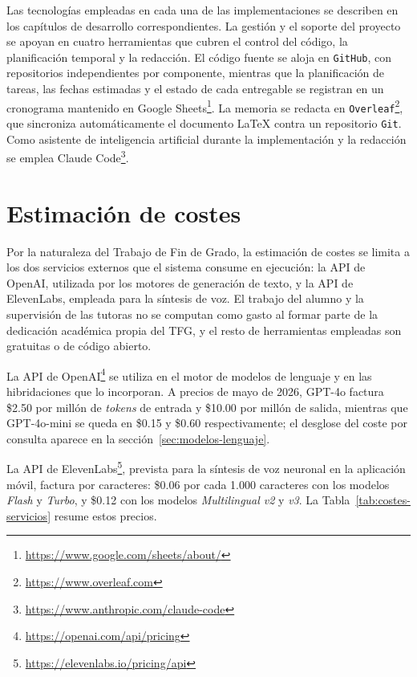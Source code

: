 Las tecnologías empleadas en cada una de las implementaciones se describen en los capítulos de desarrollo correspondientes. La gestión y el soporte del proyecto se apoyan en cuatro herramientas que cubren el control del código, la planificación temporal y la redacción. El código fuente se aloja en \texttt{GitHub}, con repositorios independientes por componente, mientras que la planificación de tareas, las fechas estimadas y el estado de cada entregable se registran en un cronograma mantenido en Google Sheets\footnote{\url{https://www.google.com/sheets/about/}}. La memoria se redacta en \texttt{Overleaf}\footnote{\url{https://www.overleaf.com}}, que sincroniza automáticamente el documento LaTeX contra un repositorio \texttt{Git}. Como asistente de inteligencia artificial durante la implementación y la redacción se emplea Claude Code\footnote{\url{https://www.anthropic.com/claude-code}}.

\section{Estimación de costes}
\label{sec:costes}

Por la naturaleza del Trabajo de Fin de Grado, la estimación de costes se limita a los dos servicios externos que el sistema consume en ejecución: la API de OpenAI, utilizada por los motores de generación de texto, y la API de ElevenLabs, empleada para la síntesis de voz. El trabajo del alumno y la supervisión de las tutoras no se computan como gasto al formar parte de la dedicación académica propia del TFG, y el resto de herramientas empleadas son gratuitas o de código abierto.

La API de OpenAI\footnote{\url{https://openai.com/api/pricing}} se utiliza en el motor de modelos de lenguaje y en las hibridaciones que lo incorporan. A precios de mayo de 2026, GPT-4o factura \$2.50 por millón de \textit{tokens} de entrada y \$10.00 por millón de salida, mientras que GPT-4o-mini se queda en \$0.15 y \$0.60 respectivamente; el desglose del coste por consulta aparece en la sección~\ref{sec:modelos-lenguaje}.

La API de ElevenLabs\footnote{\url{https://elevenlabs.io/pricing/api}}, prevista para la síntesis de voz neuronal en la aplicación móvil, factura por caracteres: \$0.06 por cada 1.000 caracteres con los modelos \textit{Flash} y \textit{Turbo}, y \$0.12 con los modelos \textit{Multilingual v2} y \textit{v3}. La Tabla~\ref{tab:costes-servicios} resume estos precios.

